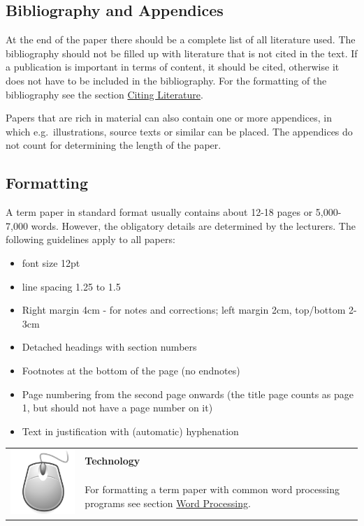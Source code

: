 \documentclass[
  english,
]{scrreprt}
\newlength{\iconwidth}
\newenvironment{displaybox}[2]{%
    \begin{center}
        \setlength\arrayrulewidth{0.75pt}%
        \arrayrulecolor{white}%
        \renewcommand{\arraystretch}{1.3}%
        \begin{tabular}{p{\iconwidth}p{\linewidth-4\tabcolsep-\iconwidth}}
            \multirow{2}{*}{#2}&\cellcolor{boxheadcol}\textbf{\sffamily\color{white}#1} \\%
            \hhline{~-}%
            &\cellcolor{boxcol}%
}{%
            \\
        \end{tabular}
        \arrayrulecolor{black}
    \end{center}
}
\newenvironment{Technology}{%
\begin{displaybox}{Technology}{\includegraphics[width=\iconwidth]{images/icon-technik}}}%
{\end{displaybox}}
\begin{document}
\subsection{Bibliography and Appendices}\label{bibliography-and-appendices}

At the end of the paper there should be a complete list of all literature used. The bibliography should not be filled up with literature that is not cited in the text. If a publication is important in terms of content, it should be cited, otherwise it does not have to be included in the bibliography. For the formatting of the bibliography see the section \hyperref[sec:citing]{Citing Literature}.

Papers that are rich in material can also contain one or more appendices, in which e.g.~illustrations, source texts or similar can be placed. The appendices do not count for determining the length of the paper.

\subsection{Formatting}\label{formatting}

A term paper in standard format usually contains about 12-18 pages or 5,000-7,000 words. However, the obligatory details are determined by the lecturers. The following guidelines apply to all papers:

\begin{itemize}
\item
  font size 12pt
\item
  line spacing 1.25 to 1.5
\item
  Right margin 4cm - for notes and corrections; left margin 2cm, top/bottom 2-3cm
\item
  Detached headings with section numbers
\item
  Footnotes at the bottom of the page (no endnotes)
\item
  Page numbering from the second page onwards (the title page counts as page 1, but should not have a page number on it)
\item
  Text in justification with (automatic) hyphenation
\end{itemize}

\begin{Technology}

For formatting a term paper with common word processing programs see section \hyperref[sec:word_processing]{Word Processing}.

\end{Technology}
\end{document}
